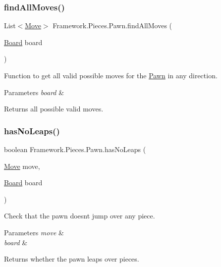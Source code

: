 \subsubsection{\texorpdfstring{find\+All\+Moves()}{findAllMoves()}}
{\footnotesize\ttfamily List$<$\hyperlink{class_framework_1_1_move}{Move}$>$ Framework.\+Pieces.\+Pawn.\+find\+All\+Moves (\begin{DoxyParamCaption}\item[{\hyperlink{class_framework_1_1_board}{Board}}]{board }\end{DoxyParamCaption})}

Function to get all valid possible moves for the \hyperlink{class_framework_1_1_pieces_1_1_pawn}{Pawn} in any direction. 
\begin{DoxyParams}{Parameters}
{\em board} & \\
\hline
\end{DoxyParams}
\begin{DoxyReturn}{Returns}
all possible valid moves. 
\end{DoxyReturn}
\hypertarget{class_framework_1_1_pieces_1_1_pawn_af5cfe8dc9ff5e669186b6257d674984d}{}\label{class_framework_1_1_pieces_1_1_pawn_af5cfe8dc9ff5e669186b6257d674984d} 
\subsubsection{\texorpdfstring{has\+No\+Leaps()}{hasNoLeaps()}}
{\footnotesize\ttfamily boolean Framework.\+Pieces.\+Pawn.\+has\+No\+Leaps (\begin{DoxyParamCaption}\item[{\hyperlink{class_framework_1_1_move}{Move}}]{move,  }\item[{\hyperlink{class_framework_1_1_board}{Board}}]{board }\end{DoxyParamCaption})}

Check that the pawn doesn\textquotesingle{}t jump over any piece. 
\begin{DoxyParams}{Parameters}
{\em move} & \\
\hline
{\em board} & \\
\hline
\end{DoxyParams}
\begin{DoxyReturn}{Returns}
whether the pawn leaps over pieces. 
\end{DoxyReturn}
\hypertarget{class_framework_1_1_pieces_1_1_pawn_a85be7f651332fcae0231f4b16e2d6e11}{}\label{class_framework_1_1_pieces_1_1_pawn_a85be7f651332fcae0231f4b16e2d6e11} 

